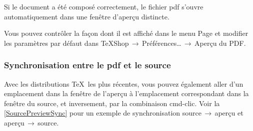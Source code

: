 \documentclass[11pt,french]{article}
\newcommand{\acr}[1]{\textsf{#1}}
\newcommand{\cmd}[1]{\textsf{#1}}
\newcommand{\mnu}[1]{\textsf{#1}}
\newcommand{\To}{\,\(\to\)\,}
\begin{document}
Si le document a été composé correctement, le fichier \acr{pdf} s'ouvre automatiquement dans une fenêtre d'aperçu distincte.

Vous pouvez contrôler la façon dont il est affiché dans le menu \mnu{Page} et modifier les paramètres par défaut dans \mnu{TeXShop}\To\mnu{Préférences…}\To\mnu{Aperçu du PDF}.

%

\subsubsection{Synchronisation entre le \acr{pdf} et le source} 

Avec les distributions \TeX\ les plus récentes, vous pouvez également aller d'un emplacement dans la fenêtre de l'aperçu à l'emplacement correspondant dans la fenêtre du source, et inversement, par la combinaison \cmd{cmd-clic}. Voir la \vref{SourcePreviewSync} pour un exemple de synchronisation source\To aperçu et aperçu\To source.


\end{document}
